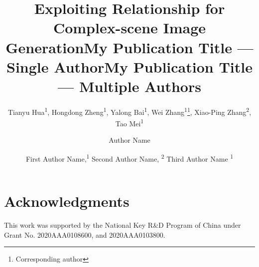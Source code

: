 \documentclass[letterpaper]{article} %
\title{Exploiting Relationship for Complex-scene Image Generation}
\author{
Tianyu Hua\textsuperscript{\rm 1}, 
    Hongdong Zheng\textsuperscript{\rm 1},
    Yalong Bai\textsuperscript{\rm 1},
    Wei Zhang\textsuperscript{\rm 1}\footnote{Corresponding author},
    Xiao-Ping Zhang\textsuperscript{\rm 2},
    Tao Mei\textsuperscript{\rm 1} \\
}
\title{My Publication Title --- Single Author}
\author {
    Author Name \\
}
\title{My Publication Title --- Multiple Authors}
\author {
    First Author Name,\textsuperscript{\rm 1}
    Second Author Name, \textsuperscript{\rm 2}
    Third Author Name \textsuperscript{\rm 1} \\
}
\begin{document}
\maketitle








\section*{Acknowledgments}
This work was supported by the National Key R\&D Program of China under Grant No. 2020AAA0108600, and 2020AAA0103800.

%

\end{document}

